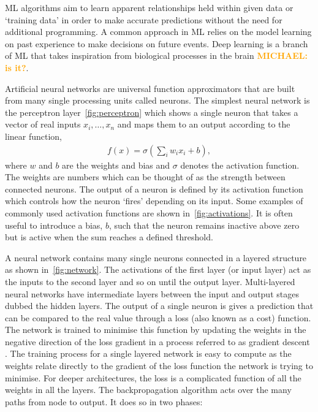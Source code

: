 \documentclass[12pt]{iopart}
\newcommand{\jordan}[1]{\textbf{\textcolor{red}{JORDAN: #1}}}
\newcommand{\chris}[1]{\textbf{\textcolor{green}{CHRIS: #1}}}
\newcommand{\michael}[1]{\textbf{\textcolor{orange}{MICHAEL: #1}}}
\begin{document}
\ac{ML} algorithms aim to learn apparent relationships held within given data or `training
data' in order to make accurate predictions without the need for additional
programming. A common approach in \ac{ML} relies on the model learning on
past experience to make decisions on future events. Deep learning is a branch of \ac{ML} that takes inspiration from biological processes in the brain \michael{is it?}. 

%

Artificial neural networks are universal function approximators that are built from many single
processing units called neurons. The simplest neural network is the perceptron
layer~\cref{fig:perceptron} which shows a single neuron that takes a vector of real
inputs $x_{i},\ldots, x_{n}$
and maps them to an output according to the linear function, 
%
\begin{align}
f(x) = \sigma(\sum_i w_i x_i + b),
\label{eqn:neuron}
\end{align}
%
where $w$ and $b$ are the weights and bias and $\sigma$
denotes the activation function. The weights are numbers which can be thought
of as the strength between connected neurons. The output of a neuron is defined by its activation function which controls how the neuron `fires' depending on its input. Some examples of commonly used activation functions are shown in~\cref{fig:activations}. It is often useful to introduce a bias, $b$, such that the neuron remains inactive
above zero but is active when the sum reaches a defined threshold. 

%
A neural network contains many single neurons connected in a layered structure
as shown in~\cref{fig:network}. The activations of the first layer (or
input layer) act as the inputs to the second layer and so on until the output
layer. Multi-layered neural networks have intermediate layers between the input
and output stages dubbed the hidden layers.
%
The output of a single neuron is gives a
prediction that can be compared to the real value through a loss (also known as a
cost) function. The network is trained to minimise this function by updating the weights in the negative
direction of the loss gradient in a process referred to as gradient
descent \cite{ruder2016overview}. The training process for a single layered network is easy to compute as the weights relate directly to the gradient of the loss function the network is trying to minimise. For deeper architectures, the loss is a complicated function of all the weights in all the layers. The backpropagation \cite{Nielsen1992} algorithm acts over the many paths from node to output. It does so in two phases:
\end{document}
